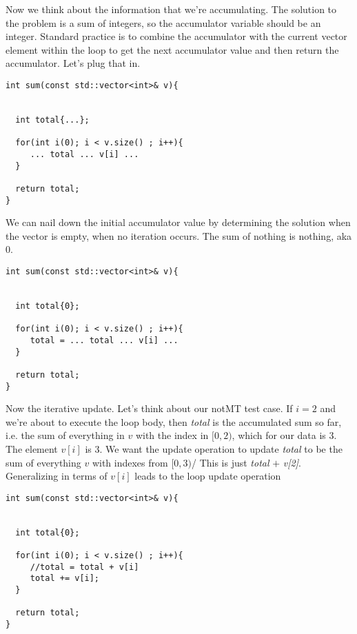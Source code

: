 \documentclass[]{tufte-handout}
\begin{document}
Now we think about the information that we're accumulating. The solution to the problem is a sum of integers, so the accumulator variable should be an integer. Standard practice is to combine the accumulator with the current vector element within the loop to get the next accumulator value and then return the accumulator. Let's plug that in. 
\begin{verbatim}
int sum(const std::vector<int>& v){


  int total{...};
  
  for(int i(0); i < v.size() ; i++){
     ... total ... v[i] ... 
  }
 
  return total;	
}
\end{verbatim}	

We can nail down the initial accumulator value by determining the solution when the vector is empty, when no iteration occurs. The sum of nothing is nothing, aka $0$.
\begin{verbatim}
int sum(const std::vector<int>& v){


  int total{0};
  
  for(int i(0); i < v.size() ; i++){
     total = ... total ... v[i] ... 
  }
 
  return total;	
}
\end{verbatim}	

Now the iterative update. Let's think about our notMT test case. If $i=2$ and we're about to execute the loop body, then \textit{total} is the accumulated sum so far, i.e. the sum of everything in $v$ with the index in $[0,2)$, which for our data is $3$. The element $v[i]$ is $3$. We want the update operation to update \textit{total} to be the sum of everything $v$ with indexes from $[0,3)$/ This is just \textit{total} $+$ \textit{v[2]}. Generalizing in terms of $v[i]$ leads to the loop update operation
\begin{verbatim}
int sum(const std::vector<int>& v){


  int total{0};
  
  for(int i(0); i < v.size() ; i++){
     //total = total + v[i]
     total += v[i];
  }
 
  return total;	
}
\end{verbatim}	
\end{document}
